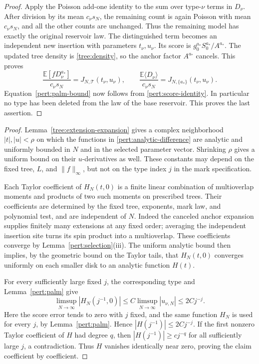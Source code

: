 \begin{proof}
Apply the Poisson add-one identity to the sum over type-$\nu$ terms
in $D_\nu$.  After division by its mean $c_\nu s_N$, the remaining
count is again Poisson with mean $c_\nu s_N$, and all the other counts
are unchanged.  Thus the remaining model has exactly the original
reservoir law.  The distinguished term becomes an independent new
insertion with parameters $t_\nu,u_\nu$.  Its score is
$g_0^{a_*}S_0^{a_*}/A^{a_*}$.  The updated tree density is
\eqref{tree:density}, so the anchor factor $A^{a_*}$ cancels.
This proves
\[
 \frac{\mathbb E[fD_\nu^{a_*}]}{c_\nu s_N}
 =J_{N,\mathcal T}(t_\nu,u_\nu),\qquad
 \frac{\mathbb E\langle D_\nu\rangle}{c_\nu s_N}
 =J_{N,\{a_*\}}(t_\nu,u_\nu).
\]
Equation~\eqref{pert:palm-bound} now follows from
\eqref{pert:score-identity}.  In particular no type has been deleted
from the law of the base reservoir.  This proves the last assertion.
\end{proof}


\begin{proof}
Lemma~\ref{tree:extension-expansion} gives a complex neighborhood
$|t|,|u|<\rho$ on which the functions in
\eqref{pert:analytic-difference} are analytic and uniformly bounded
in $N$ and in the selected parameter vector.  Shrinking $\rho$ gives
a uniform bound on their $u$-derivatives as well.  These constants may
depend on the fixed tree, $L$, and $\|f\|_\infty$, but not on the type
index $j$ in the mark specification.

Each Taylor coefficient of $H_N(t,0)$ is a finite linear combination
of multioverlap moments and products of two such moments on prescribed trees.
Their coefficients are determined by the fixed tree, exponents, mark law,
and polynomial test, and are independent of $N$. Indeed the canceled
anchor expansion supplies finitely many extensions at any fixed
order; averaging the independent insertion site turns its spin
product into a multioverlap.  These coefficients converge by
Lemma~\ref{pert:selection}(iii).  The uniform analytic bound then
implies, by the geometric bound on the Taylor tails, that
$H_N(t,0)$ converges uniformly on each smaller disk to an analytic
function $H(t)$.

For every sufficiently large fixed $j$, the corresponding type and
Lemma~\ref{pert:palm} give
\[
 \limsup_{N\to\infty}|H_N(j^{-1},0)|
 \leq C\limsup_{N\to\infty}|u_{\nu,N}|
 \leq2Cj^{-j}.
\]
Here the score error tends to zero with $j$ fixed, and the same
function $H_N$ is used for every $j$, by Lemma~\ref{pert:palm}.
Hence $|H(j^{-1})|\leq2Cj^{-j}$.  If the first nonzero Taylor
coefficient of $H$ had degree $q$, then
$|H(j^{-1})|\geq c j^{-q}$ for all sufficiently large $j$, a
contradiction.  Thus $H$ vanishes identically near zero, proving the
claim coefficient by coefficient.
\end{proof}

